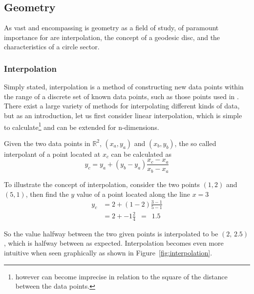 %
%
%
\subsection{Geometry}
As vast and encompassing is geometry as a field of study, of paramount importance for  are interpolation, the concept of a geodesic disc, and the characteristics of a circle sector.

%
\subsubsection{Interpolation}
Simply stated, interpolation is a method of constructing new data points within the range of a discrete set of known data points, such as those points used in \tdd{}. There exist a large variety of methods for interpolating different kinds of data, but as an introduction, let us first consider linear interpolation, which is simple to calculate\footnote{however can become imprecise in relation to the square of the distance between the data points.} and can be extended for n-dimensions.

Given the two data points in $\mathbb{R}^2$, $(x_a, y_a)$ and $(x_b, y_b)$, the so called interpolant of a point located at $x_c$ can be calculated as
%
\begin{equation}
	y_c = y_a + (y_b - y_a) \frac{x_c - x_a}{x_b - x_a}
	\label{eq:interpolationGeneral}
\end{equation}

To illustrate the concept of interpolation, consider the two points $(1, 2)$ and $(5, 1)$, then find the $y$ value of a point located along the line $x = 3$
%
\begin{align}
	y_c & = 2 + (1 - 2) \frac{3 - 1}{5 - 1} \\
	& = 2 + -1 \frac{2}{4} \enspace = \enspace  1.5
	\label{eq:interpolationSpecific}
\end{align}

So the value halfway between the two given points is interpolated to be $(2,\,2.5)$, which is halfway between as expected. Interpolation becomes even more intuitive when seen graphically as shown in Figure~\ref{fig:interpolation}.

